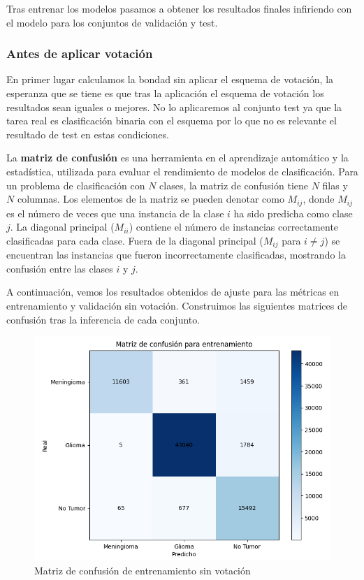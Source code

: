 Tras entrenar los modelos pasamos a obtener los resultados finales infiriendo con el modelo para los conjuntos de validación y test.

\subsubsection{Antes de aplicar votación}

En primer lugar calculamos la bondad sin aplicar el esquema de votación, la esperanza que se tiene es que tras la aplicación el esquema de votación los resultados sean iguales o mejores. No lo aplicaremos al conjunto test ya que la tarea real es clasificación binaria con el esquema por lo que no es relevante el resultado de test en estas condiciones. 

La \textbf{matriz de confusión} es una herramienta en el aprendizaje automático y la estadística, utilizada para evaluar el rendimiento de modelos de clasificación. Para un problema de clasificación con $N$ clases, la matriz de confusión tiene $N$ filas y $N$ columnas. Los elementos de la matriz se pueden denotar como $M_{ij}$, donde $M_{ij}$ es el número de veces que una instancia de la clase $i$ ha sido predicha como clase $j$. La diagonal principal ($M_{ii}$) contiene el número de instancias correctamente clasificadas para cada clase. Fuera de la diagonal principal ($M_{ij}$ para $i \neq j$) se encuentran las instancias que fueron incorrectamente clasificadas, mostrando la confusión entre las clases $i$ y $j$.


A continuación, vemos los resultados obtenidos de ajuste para las métricas en entrenamiento y validación sin votación. Construimos las siguientes matrices de confusión tras la inferencia de cada conjunto.
 
\begin{figure}[H]
	\centering
	\includegraphics[width=0.7\linewidth]{imagenes/task1_results_train.png}
	\caption{Matriz de confusión de entrenamiento sin votación}
\end{figure}

